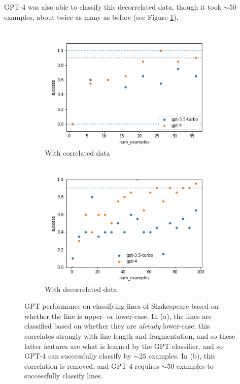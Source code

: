 \documentclass[a4paper, 11pt]{article}
\begin{document}
GPT-4 was also able to classify this decorrelated data, though it took ${\sim}50$ examples, about twice as many as before (see Figure \ref{fig:corr_class}).


\begin{figure}
\centering
\begin{subfigure}{0.49\textwidth}
    \includegraphics[width=\textwidth]{images/lowercase-classification-with-correlation.png}
    \caption{With correlated data}
    \label{fig:corr_class}
\end{subfigure}
\hfill
\begin{subfigure}{0.49\textwidth}
    \includegraphics[width=\textwidth]{images/lowercase-classification-without-correlation.png}
    \caption{With decorrelated data}
    \label{fig:decorr_class}
\end{subfigure}
\caption{
GPT performance on classifying lines of Shakespeare based on whether the line is upper- or lower-case.
In (a), the lines are classified based on whether they are \emph{already} lower-case; this correlates strongly with line length and fragmentation, and so these latter features are what is learned by the GPT classifier, and so GPT-4 can successfully classify by ${\sim} 25$ examples.
In (b), this correlation is removed, and GPT-4 requires ${\sim} 50$ examples to successfully classify lines.
}
\end{figure}
\end{document}
